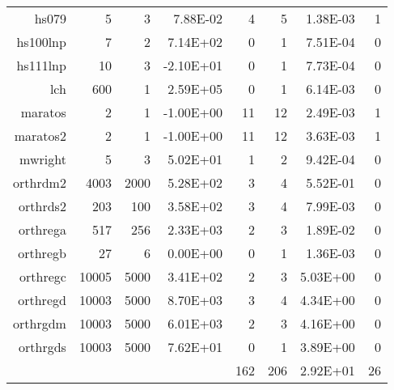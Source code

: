 \begin{table}[htbp]
\begin{tabular}{rrrrrrrr}
    hs079 & 5     & 3     & 7.88E-02 & 4     & 5     & 1.38E-03 & 1 \\
    hs100lnp & 7     & 2     & 7.14E+02 & 0     & 1     & 7.51E-04 & 0 \\
    hs111lnp & 10    & 3     & -2.10E+01 & 0     & 1     & 7.73E-04 & 0 \\
    lch   & 600   & 1     & 2.59E+05 & 0     & 1     & 6.14E-03 & 0 \\
    maratos & 2     & 1     & -1.00E+00 & 11    & 12    & 2.49E-03 & 1 \\
    maratos2 & 2     & 1     & -1.00E+00 & 11    & 12    & 3.63E-03 & 1 \\
    mwright & 5     & 3     & 5.02E+01 & 1     & 2     & 9.42E-04 & 0 \\
    orthrdm2 & 4003  & 2000  & 5.28E+02 & 3     & 4     & 5.52E-01 & 0 \\
    orthrds2 & 203   & 100   & 3.58E+02 & 3     & 4     & 7.99E-03 & 0 \\
    orthrega & 517   & 256   & 2.33E+03 & 2     & 3     & 1.89E-02 & 0 \\
    orthregb & 27    & 6     & 0.00E+00 & 0     & 1     & 1.36E-03 & 0 \\
    orthregc & 10005 & 5000  & 3.41E+02 & 2     & 3     & 5.03E+00 & 0 \\
    orthregd & 10003 & 5000  & 8.70E+03 & 3     & 4     & 4.34E+00 & 0 \\
    orthrgdm & 10003 & 5000  & 6.01E+03 & 2     & 3     & 4.16E+00 & 0 \\
    orthrgds & 10003 & 5000  & 7.62E+01 & 0     & 1     & 3.89E+00 & 0 \\
          &       &       &       & 162   & 206   & 2.92E+01 & 26 \\
    \bottomrule
    \end{tabular}%
  \label{tab:addlabel}%
\end{table}%
